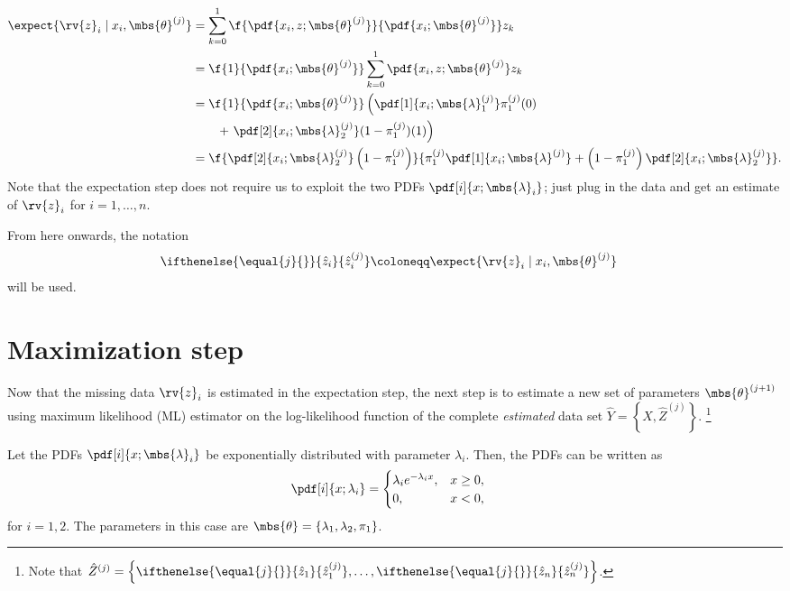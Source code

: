 \documentclass{tufte-handout}
\newcommand{\zhat}[2][{}]{\ifthenelse{\equal{#1}{}}{\hat{z}_{#2}}{\hat{z}_{#2}^{(#1)}}}
\begin{document}
    \begin{align}
        \expect{\rv{z}_{i} \mid x_{i}, \mbs{\theta}^{(j)}}
        &=
        \sum_{k=0}^{1}\f{\pdf{x_{i},z;\mbs{\theta}^{(j)}}}{\pdf{x_{i}; \mbs{\theta}^{(j)}}}z_{k}\\
        &=
        \f{1}{\pdf{x_{i}; \mbs{\theta}^{(j)}}}\sum_{k=0}^{1}\pdf{x_{i},z;\mbs{\theta}^{(j)}}z_{k}\\
        &=
        \f{1}{\pdf{x_{i}; \mbs{\theta}^{(j)}}}\left( \pdf[1]{x_{i}; \mbs{\lambda}_{1}^{(j)}}\pi_{1}^{(j)}(0)\right.\nonumber\\&\qquad + \left.\pdf[2]{x_{i}; \mbs{\lambda}_{2}^{(j)}}(1-\pi_{1}^{(j)})(1) \right)\\
        &=
        \f{
            \pdf[2]{x_{i}; \mbs{\lambda}_{2}^{(j)}}\left(1-\pi_{1}^{(j)}\right)
        }{
            \pi_{1}^{(j)}\pdf[1]{x_{i}; \mbs{\lambda}^{(j)}} + \left( 1-\pi_{1}^{(j)} \right)\pdf[2]{x_{i}; \mbs{\lambda}_{2}^{(j)}}
        }.
    \end{align}
    Note that the expectation step does not require us to exploit the two PDFs $\pdf[i]{x; \mbs{\lambda}_{i}}$; just plug in the data and get an estimate of $\rv{z}_{i}$ for $i=1,\ldots, n$.

    
    \begin{blueBox}
        From here onwards, the notation 
        \begin{align}
            \label{eq:xhat notation def}
            \zhat[j]{i} &\coloneqq  
            \expect{\rv{z}_{i} \mid x_{i}, \mbs{\theta}^{(j)}}
        \end{align}
        will be used.
    \end{blueBox}
    \section{Maximization step}
    Now that the missing data $\rv{z}_{i}$ is estimated in the expectation step, the next step is to estimate a new set of parameters $\mbs{\theta}^{(j+1)}$ using maximum likelihood (ML) estimator on the log-likelihood function of the complete \emph{estimated} data set $\hat{Y} = \left\{ X, \hat{Z}^{(j)} \right\}$. \footnote{Note that $\hat{Z}^{(j)} = \left\{ \zhat[j]{1},\ldots, \zhat[j]{n} \right\}$.}

    Let the PDFs $\pdf[i]{x; \mbs{\lambda}_{i}}$ be exponentially distributed with parameter $\lambda_{i}$. Then, the PDFs can be written as
    \begin{align}
        \pdf[i]{x; \lambda_{i}} &= 
        \begin{cases}
            \lambda_{i}e^{-\lambda_{i} x}, & x\geq 0,\\
            0, &x<0,
        \end{cases}
    \end{align}
    for $i=1,2$. The parameters in this case are $\mbs{\theta} = \left\{ \lambda_{1}, \lambda_{2}, \pi_{1} \right\}$.
\end{document}
